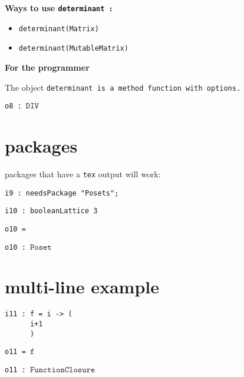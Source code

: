 \documentclass[12pt,a4paper]{amsart}
\begin{document}
\par \medskip\noindent\begingroup\Large\bf
Ways to use \begingroup\tt determinant\endgroup{} :\endgroup
\par \smallskip%
\begin{itemize}
\item \begingroup\tt {}determinant(Matrix){}\endgroup{}
\item \begingroup\tt {}determinant(MutableMatrix){}\endgroup{}
\end{itemize}

\par \medskip\noindent\begingroup\Large\bf
For the programmer\endgroup
\par \smallskip%

\par The object \begingroup\tt determinant\endgroup{} is a \begingroup\tt method\ function\ with\ options\endgroup{}.

\noindent\verb|o8 : |$\texttt{DIV}$
\smallskip


\section{packages}
packages that have a {\tt tex} output will work:
\smallskip
\begin{verbatim}
i9 : needsPackage "Posets";
\end{verbatim}
\begin{verbatim}
i10 : booleanLattice 3
\end{verbatim}
\noindent\verb|o10 = |


\noindent\verb|o10 : |$\texttt{Poset}$
\smallskip


\section{multi-line example}
\smallskip
\begin{verbatim}
i11 : f = i -> (
      i+1
      )
\end{verbatim}
\noindent\verb|o11 = |$\texttt{f}$

\noindent\verb|o11 : |$\texttt{FunctionClosure}$
\smallskip
\end{document}
